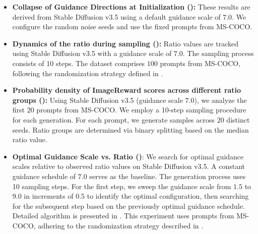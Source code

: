 \begin{itemize}
    \item \textbf{Collapse of Guidance Directions at Initialization ():}
    These results are derived from Stable Diffusion v3.5 using a default guidance scale of $7.0$. We configure the random noise seeds and use the fixed prompts from MS-COCO.

    \item \textbf{Dynamics of the ratio during sampling ():}
    Ratio values are tracked using Stable Diffusion v3.5 with a guidance scale of $7.0$. The sampling process consists of 10 steps. The dataset comprises $100$ prompts from MS-COCO, following the randomization strategy defined in .

    \item \textbf{Probability density of ImageReward scores across different ratio groups ():}
    Using Stable Diffusion v3.5 (guidance scale $7.0$), we analyze the first $20$ prompts from MS-COCO. We employ a 10-step sampling procedure for each generation. For each prompt, we generate samples across $20$ distinct seeds. Ratio groups are determined via binary splitting based on the median ratio value.

    \item \textbf{Optimal Guidance Scale vs. Ratio ()}:
    We search for optimal guidance scales relative to observed ratio values on Stable Diffusion v3.5. A constant guidance schedule of $7.0$ serves as the baseline. The generation process uses 10 sampling steps. For the first step, we sweep the guidance scale from $1.5$ to $9.0$ in increments of $0.5$ to identify the optimal configuration, then searching for the subsequent step based on the previously optimal guidance schedule. Detailed algorithm is presented in . This experiment uses prompts from MS-COCO, adhering to the randomization strategy described in .


\end{itemize}

